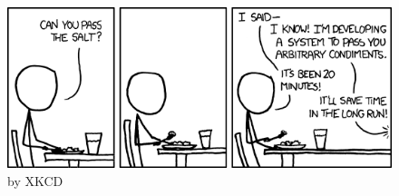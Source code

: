 \begin{figure}[H]
    \centering
    \includegraphics[scale=0.7]{meme.png}
    \caption{by XKCD}
\end{figure}